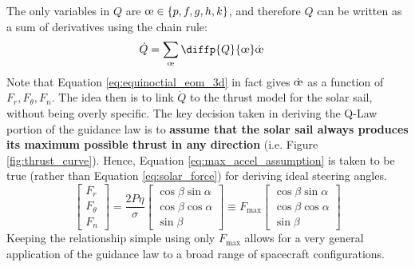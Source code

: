 The only variables in \(Q\) are \(\moe \in \{p, f, g, h, k\}\), and therefore \(Q\) can be written as a sum of derivatives using the chain rule:
\begin{align*}
  \dot{Q} & = \sum_{\moe} \diffp{Q}{{\moe}} \dot{\moe}
\end{align*}
Note that Equation \ref{eq:equinoctial_eom_3d} in fact gives \(\dot{\moe}\) as a function of \(F_r, F_\theta, F_n\). The idea then is to link \(\dot{Q}\) to the thrust model for the solar sail, without being overly specific. The key decision taken in deriving the Q-Law portion of the guidance law is to \textbf{assume that the solar sail always produces its maximum possible thrust in any direction} (i.e. Figure \ref{fig:thrust_curve}). Hence, Equation \ref{eq:max_accel_assumption} is taken to be true (rather than Equation \ref{eq:solar_force}) for deriving ideal steering angles.
\begin{equation}
  \begin{bmatrix}
    F_r      \\
    F_\theta \\
    F_n
  \end{bmatrix} =
  \frac{2P\eta}{\sigma}
  \begin{bmatrix}
    \cos \beta \sin \alpha \\
    \cos \beta \cos \alpha \\
    \sin \beta
  \end{bmatrix}
  \equiv
  F_{\max}
  \begin{bmatrix}
    \cos \beta \sin \alpha \\
    \cos \beta \cos \alpha \\
    \sin \beta
  \end{bmatrix}
  \label{eq:max_accel_assumption}
\end{equation}
Keeping the relationship simple using only \(F_{\max}\) allows for a very general application of the guidance law to a broad range of spacecraft configurations.

